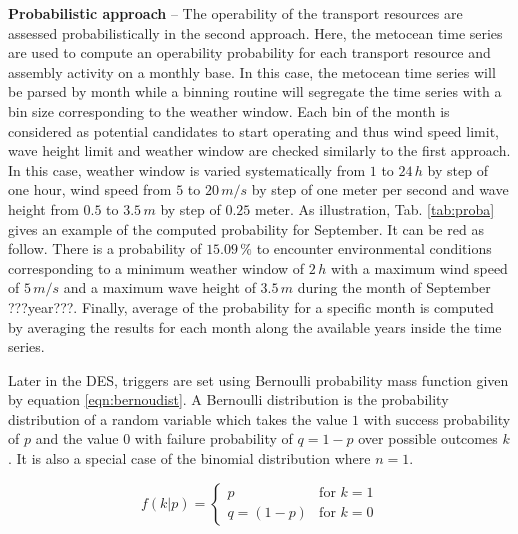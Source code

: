 \textbf{Probabilistic approach} -- The operability of the transport resources are assessed probabilistically in the second approach. Here, the metocean time series are used to compute an operability probability for each transport resource and assembly activity on a monthly base. In this case, the metocean time series will be parsed by month while a binning routine will segregate the time series with a bin size corresponding to the weather window. Each bin of the month is considered as potential candidates to start operating and thus wind speed limit, wave height limit and weather window are checked similarly to the first approach. In this case, weather window is varied systematically from $1$ to $24\, h$ by step of one hour, wind speed from $5$ to $20\, m/s$ by step of one meter per second and wave height from $0.5$ to $3.5\, m$ by step of $0.25$ meter. As illustration, Tab. \ref{tab:proba} gives an example of the computed probability for September. It can be red as follow. There is a probability of $15.09\, \%$ to encounter environmental conditions corresponding to a minimum weather window of $2\, h$ with a maximum wind speed of $5\, m/s$ and a maximum wave height of $3.5\, m$ during the month of September ???year???. Finally, average of the probability for a specific month is computed by averaging the results for each month along the available years inside the time series.


Later in the DES, triggers are set using Bernoulli probability mass function given by equation \ref{eqn:bernoudist}. A Bernoulli distribution is the probability distribution of a random variable which takes the value $1$ with success probability of $p$ and the value $0$ with failure probability of $q=1-p$ over possible outcomes $k$. It is also a special case of the binomial distribution where $n=1$.

\begin{equation}
\label{eqn:bernoudist}
f\left(k \vert p \right) = \begin{cases} p & \text{for $k=1$} \\ q=(1-p) & \text{for $k=0$} \end{cases}
\end{equation}











